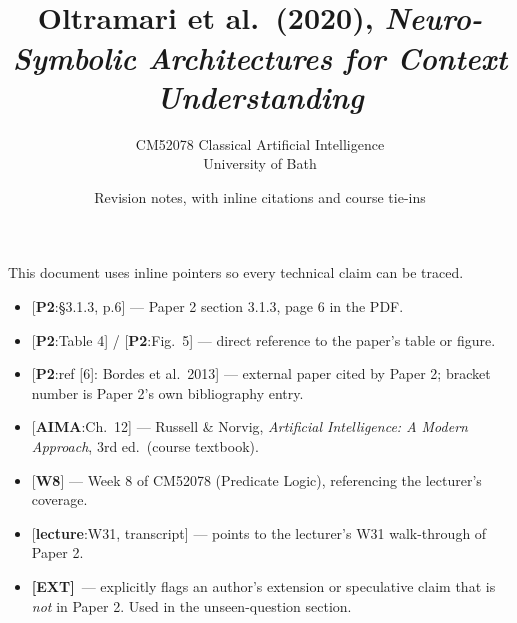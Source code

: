 \documentclass[11pt, a4paper]{article}
\title{\vspace{-1cm}{\Huge\bfseries Paper 2 — Essay Preparation (v2)} \\[0.4em]{\large Oltramari et al.\ (2020), \emph{Neuro-Symbolic Architectures for Context Understanding}}}
\author{\large CM52078 Classical Artificial Intelligence \\[0.2em]\normalsize University of Bath}
\date{Revision notes, with inline citations and course tie-ins}
\newcommand{\paperref}[1]{\textcolor{srcBd}{\small[\textbf{P2}:#1]}}
\newcommand{\aimaref}[1]{\textcolor{srcBd}{\small[\textbf{AIMA}:#1]}}
\newcommand{\lectref}[1]{\textcolor{srcBd}{\small[\textbf{lecture}:#1]}}
\newcommand{\courseref}[1]{\textcolor{srcBd}{\small[\textbf{W#1}]}}
\newcommand{\extflag}{\textcolor{trapBd}{\textbf{[EXT]}}\,}
\begin{document}
\maketitle
\thispagestyle{empty}

\vspace{1em}

\begin{srcbox}
This document uses inline pointers so every technical claim can be traced.
\begin{itemize}[leftmargin=*, itemsep=0.1em]
  \item \paperref{§3.1.3, p.6} — Paper 2 section 3.1.3, page 6 in the PDF.
  \item \paperref{Table 4} / \paperref{Fig.\ 5} — direct reference to the paper's table or figure.
  \item \paperref{ref [6]: Bordes et al.\ 2013} — external paper cited by Paper 2; bracket number is Paper 2's own bibliography entry.
  \item \aimaref{Ch.\ 12} — Russell \& Norvig, \emph{Artificial Intelligence: A Modern Approach}, 3rd ed.\ (course textbook).
  \item \courseref{8} — Week 8 of CM52078 (Predicate Logic), referencing the lecturer's coverage.
  \item \lectref{W31, transcript} — points to the lecturer's W31 walk-through of Paper 2.
  \item \extflag{} — explicitly flags an author's extension or speculative claim that is \emph{not} in Paper 2. Used in the unseen-question section.
\end{itemize}
\end{srcbox}
\end{document}
